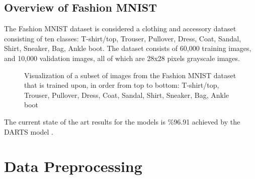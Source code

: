 \documentclass[conference]{IEEEtran}
\begin{document}
\subsection{Overview of Fashion MNIST}

The Fashion MNIST dataset is considered a clothing and accessory dataset consisting of ten classes: T-shirt/top, Trouser, Pullover, Dress, Coat, Sandal, Shirt, Sneaker, Bag, Ankle boot. The dataset consists of 60,000 training images, and 10,000 validation images, all of which are 28x28 pixels grayscale images. 

\begin{figure}[htbp]
\caption{ Visualization of a subset of images from the Fashion MNIST dataset that is trained upon, in order from top to bottom: T-shirt/top, Trouser, Pullover, Dress, Coat, Sandal, Shirt, Sneaker, Bag, Ankle boot } 
\end{figure}

The current state of the art results for the models is \%96.91 achieved by the DARTS model \cite{Darts}. 

\section{Data Preprocessing}
\end{document}
